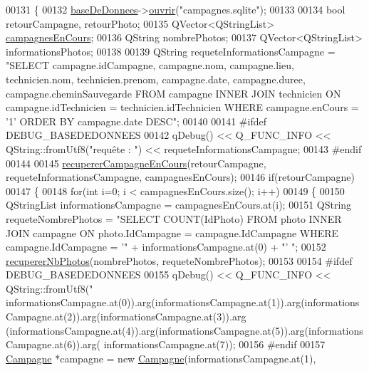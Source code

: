\begin{DoxyCode}
00131 \{
00132     \hyperlink{class_i_h_m_accueil_ab56d9846c071396a92f88272880e2c1f}{baseDeDonnees}->\hyperlink{class_base_de_donnees_a7f6a5510b08017b0d99115a84252f186}{ouvrir}(\textcolor{stringliteral}{"campagnes.sqlite"});
00133 
00134     \textcolor{keywordtype}{bool} retourCampagne, retourPhoto;
00135     QVector<QStringList> \hyperlink{class_i_h_m_accueil_ad3827b81480eb201b5927c16a2ad1c46}{campagnesEnCours};
00136     QString nombrePhotos;
00137     QVector<QStringList> informationsPhotos;
00138 
00139     QString requeteInformationsCampagne = \textcolor{stringliteral}{"SELECT campagne.idCampagne, campagne.nom, campagne.lieu,
       technicien.nom, technicien.prenom, campagne.date, campagne.duree, campagne.cheminSauvegarde FROM campagne INNER
       JOIN technicien ON campagne.idTechnicien = technicien.idTechnicien WHERE campagne.enCours = '1' ORDER BY
       campagne.date DESC"};
00140 
00141 \textcolor{preprocessor}{    #ifdef DEBUG\_BASEDEDONNEES}
00142     qDebug() << Q\_FUNC\_INFO << QString::fromUtf8(\textcolor{stringliteral}{"requête : "}) << requeteInformationsCampagne;
00143 \textcolor{preprocessor}{    #endif}
00144 
00145     \hyperlink{class_i_h_m_accueil_a0ffb0f0c7c9c613083933514690f2772}{recupererCampagneEnCours}(retourCampagne, requeteInformationsCampagne, 
      campagnesEnCours);
00146     \textcolor{keywordflow}{if}(retourCampagne)
00147     \{
00148         \textcolor{keywordflow}{for}(\textcolor{keywordtype}{int} i=0; i < campagnesEnCours.size(); i++)
00149         \{
00150             QStringList informationsCampagne = campagnesEnCours.at(i);
00151             QString requeteNombrePhotos = \textcolor{stringliteral}{"SELECT COUNT(IdPhoto) FROM photo INNER JOIN campagne ON
       photo.IdCampagne = campagne.IdCampagne WHERE campagne.IdCampagne = '"} + informationsCampagne.at(0) + \textcolor{stringliteral}{"' "};
00152             \hyperlink{class_i_h_m_accueil_aa09878b2e3e3024220291165b5c528a6}{recupererNbPhotos}(nombrePhotos, requeteNombrePhotos);
00153 
00154 \textcolor{preprocessor}{            #ifdef DEBUG\_BASEDEDONNEES}
00155             qDebug() << Q\_FUNC\_INFO << QString::fromUtf8(\textcolor{stringliteral}{"%
      informationsCampagne.at(0)).arg(informationsCampagne.at(1)).arg(informationsCampagne.at(2)).arg(informationsCampagne.at(3)).arg
      (informationsCampagne.at(4)).arg(informationsCampagne.at(5)).arg(informationsCampagne.at(6)).arg(
      informationsCampagne.at(7));
00156 \textcolor{preprocessor}{            #endif}
00157             \hyperlink{class_campagne}{Campagne} *campagne = \textcolor{keyword}{new} \hyperlink{class_campagne}{Campagne}(informationsCampagne.at(1), 
}
\end{DoxyCode}

